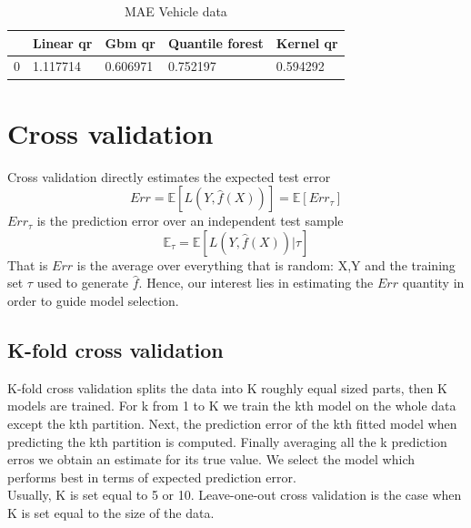 \begin{table}
    \caption{MAE Vehicle data}
    \begin{tabular}{lllll}
    \toprule
     & Linear qr & Gbm qr & Quantile forest & Kernel qr \\
    \midrule
    0 & 1.117714 & 0.606971 & 0.752197 & 0.594292 \\
    \bottomrule
    \end{tabular}
\end{table}
    

\section{Cross validation}
Cross validation directly estimates the expected test error
\begin{equation}
    Err=\mathbb{E}\left[L(Y,\hat{f}(X))\right]=\mathbb{E}\left[Err_{\tau}\right]
\end{equation}
$Err_{\tau}$ is the prediction error over an independent test sample
\begin{equation}
    \mathbb{E}_{\tau}=\mathbb{E}\left[L(Y,\hat{f}(X))| \tau \right]
\end{equation}
That is $Err$ is the average over everything that is random: X,Y and the training set $\tau$ used to generate $\hat{f}$. Hence, our interest lies in estimating the $Err$ quantity in order to guide model selection.
\subsection{K-fold cross validation}
K-fold cross validation splits the data into K roughly equal sized parts, then K models are trained. For k from 1 to K we train the kth model on the whole data except the kth partition. Next,  the prediction error of the kth fitted model when predicting the kth partition is computed. Finally averaging all the k prediction erros we obtain an estimate for its true value. We select the model which performs best in terms of expected prediction error.
\\
Usually, K is set equal to 5 or 10. Leave-one-out cross validation is the case when K is set equal to the size of the data.
